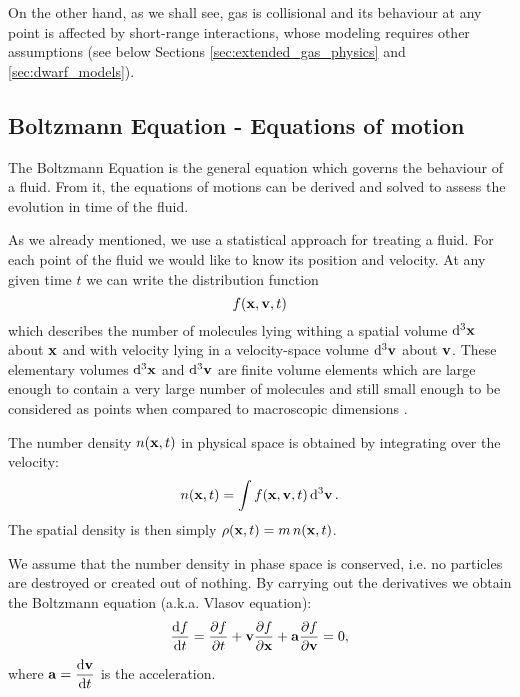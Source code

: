 On the other hand, as we shall see, gas is collisional and its behaviour at any point is affected by short-range interactions, whose modeling requires other assumptions (see below Sections \ref{sec:extended_gas_physics} and \ref{sec:dwarf_models}).

\subsection{Boltzmann Equation - Equations of motion}
The Boltzmann Equation is the general equation which governs the behaviour of a fluid.
From it, the equations of motions can be derived and solved to assess the evolution in time of the fluid.

As we already mentioned, we use a statistical approach for treating a fluid.
For each point of the fluid we would like to know its position and velocity.
At any given time $t$ we can write the distribution function
\begin{equation}
f(\boldsymbol{\mathbf{x}}, \boldsymbol{\mathbf{v}}, t)
\end{equation}
which describes the number of molecules lying withing a spatial volume $\dd[3]{\boldsymbol{\mathbf{x}}}$ about $\boldsymbol{\mathbf{x}}$ and with velocity lying in a velocity-space volume $\dd[3]{\boldsymbol{\mathbf{v}}}$ about $\boldsymbol{\mathbf{v}}$.
These elementary volumes $\dd[3]{\boldsymbol{\mathbf{x}}}$ and $\dd[3]{\boldsymbol{\mathbf{v}}}$ are finite volume elements which are large enough to contain a very large number of molecules and still small enough to be considered as points when compared to macroscopic dimensions \citep{Huang1987}.

The number density $n(\boldsymbol{\mathbf{x}}, t)$ in physical space is obtained by integrating over the velocity:
\begin{equation}
n(\boldsymbol{\mathbf{x}},t ) = \int f(\boldsymbol{\mathbf{x}}, \boldsymbol{\mathbf{v}}, t) \dd[3]{\boldsymbol{\mathbf{v}}}.
\end{equation}
The spatial density is then simply $\rho(\boldsymbol{\mathbf{x}}, t) = m\,n(\boldsymbol{\mathbf{x}}, t)$.

We assume that the number density in phase space is conserved, i.e. no particles are destroyed or created out of nothing.
By carrying out the derivatives we obtain the Boltzmann equation (a.k.a. Vlasov equation):
\begin{equation}
\dv{f}{t}(\boldsymbol{\mathbf{x}}, \boldsymbol{\mathbf{v}}, t) = \pdv{f}{t} + \boldsymbol{\mathbf{v}} \pdv{f}{\boldsymbol{\mathbf{x}}} + \boldsymbol{\mathbf{a}} \pdv{f}{\boldsymbol{\mathbf{v}}} = 0,
\end{equation}
where $\displaystyle \boldsymbol{\mathbf{a}} = \dv{\boldsymbol{\mathbf{v}}}{t}$ is the acceleration.


